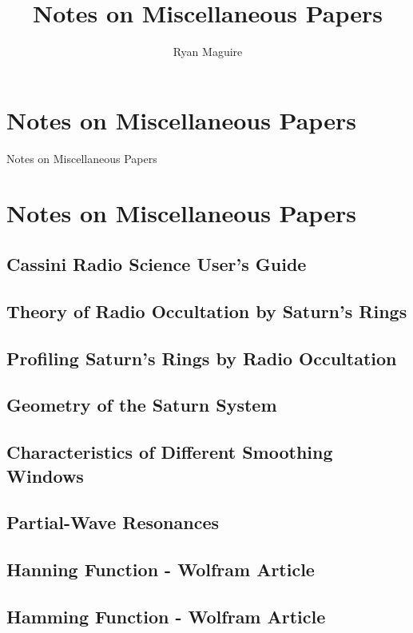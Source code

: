 \documentclass[crop=false,class=book,oneside]{standalone}
\begin{document}
    \ifx\ifresearch\undefined
        \title{Notes on Miscellaneous Papers}
        \author{Ryan Maguire}
        \date{\vspace{-5ex}}
        \maketitle
        \tableofcontents
        \chapter*{Notes on Miscellaneous Papers}
                        {Notes on Miscellaneous Papers}
        \setcounter{chapter}{1}
    \else
        \chapter{Notes on Miscellaneous Papers}
    \fi
    \section{Cassini Radio Science User's Guide}
        \label{sec:usrguide}

    \section{Theory of Radio Occultation by Saturn's Rings}

    \section{Profiling Saturn's Rings by Radio Occultation}
    \section{Geometry of the Saturn System}
    \section{Characteristics of Different Smoothing Windows}
    \section{Partial-Wave Resonances}
    \section{Hanning Function - Wolfram Article}
    \section{Hamming Function - Wolfram Article}
\end{document}

